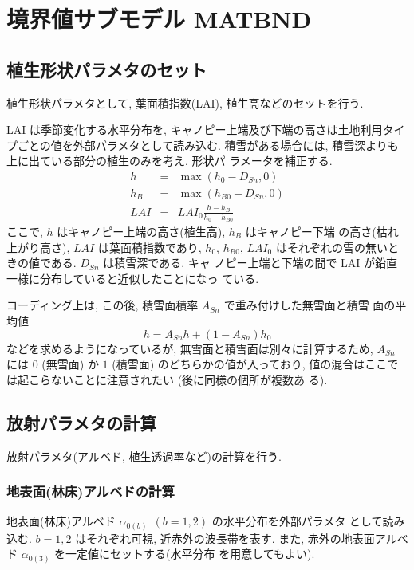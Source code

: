 \section{境界値サブモデル MATBND}

\subsection{植生形状パラメタのセット}

植生形状パラメタとして, 葉面積指数(LAI), 植生高などのセットを行う.

LAI は季節変化する水平分布を, キャノピー上端及び下端の高さは土地利用タイ
プごとの値を外部パラメタとして読み込む.
積雪がある場合には, 積雪深よりも上に出ている部分の植生のみを考え, 形状パ
ラメータを補正する.
\begin{eqnarray}
 h &=& \max( h_0 - D_{Sn}, 0 ) \\
 h_B &=& \max( h_{B0} - D_{Sn}, 0 ) \\
 LAI &=& LAI_0 \frac{h-h_B}{h_0-h_{B0}}
\end{eqnarray}
ここで, $h$ はキャノピー上端の高さ(植生高), $h_B$ はキャノピー下端
の高さ(枯れ上がり高さ), $LAI$ は葉面積指数であり, $h_0$, $h_{B0}$,
$LAI_0$ はそれぞれの雪の無いときの値である. $D_{Sn}$ は積雪深である. キャ
ノピー上端と下端の間で LAI が鉛直一様に分布していると近似したことになっ
ている.

コーディング上は, この後, 積雪面積率 $A_{Sn}$ で重み付けした無雪面と積雪
面の平均値
\[
 h = A_{Sn} h + ( 1 - A_{Sn} ) h_0
\]
などを求めるようになっているが, 無雪面と積雪面は別々に計算するため,
$A_{Sn}$ には $0$ (無雪面) か $1$ (積雪面) のどちらかの値が入っており,
値の混合はここでは起こらないことに注意されたい (後に同様の個所が複数あ
る).

\subsection{放射パラメタの計算}

放射パラメタ(アルベド, 植生透過率など)の計算を行う.

\subsubsection{地表面(林床)アルベドの計算}

地表面(林床)アルベド $\alpha_{0(b)}\ \ (b=1,2)$ の水平分布を外部パラメタ
として読み込む. $b=1, 2$ はそれぞれ可視, 近赤外の波長帯を表す.
また, 赤外の地表面アルベド $\alpha_{0(3)}$ を一定値にセットする(水平分布
を用意してもよい).

